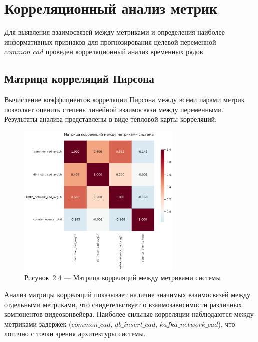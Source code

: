\section{Корреляционный анализ метрик}

\hspace*{1.25cm}Для выявления взаимосвязей между метриками и определения наиболее информативных признаков для прогнозирования целевой переменной $common\_cad$ проведен корреляционный анализ временных рядов.

\subsection{Матрица корреляций Пирсона}

\hspace*{1.25cm}Вычисление коэффициентов корреляции Пирсона между всеми парами метрик позволяет оценить степень линейной взаимосвязи между переменными. Результаты анализа представлены в виде тепловой карты корреляций.

\begin{figure}[H]
	\centering
	\includegraphics[width=0.7\textwidth]{figures/chapter2/correlation_matrix_heatmap.png}
	\caption*{Рисунок~2.4 --- Матрица корреляций между метриками системы}
	\label{fig:correlation_matrix}
\end{figure}

\hspace*{1.25cm}Анализ матрицы корреляций показывает наличие значимых взаимосвязей между отдельными метриками, что свидетельствует о взаимозависимости различных компонентов видеоконвейера. Наиболее сильные корреляции наблюдаются между метриками задержек ($common\_cad$, $db\_insert\_cad$, $kafka\_network\_cad$), что логично с точки зрения архитектуры системы.

